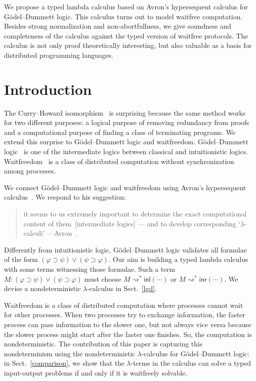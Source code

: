\documentclass[doctor]{iscs-thesis}
\newcommand{\reduce}{\rightsquigarrow}
\newcommand{\reduction}{\reduce^\ast}
\newcommand{\linl}[1]{\mathsf{inl}\left({#1}\right)}
\newcommand{\linr}[1]{\mathsf{inr}\left({#1}\right)}
\newcommand{\tj}   [2]{ {#1} \colon{#2} }
\begin{document}
We propose a typed lambda calculus based on Avron's hypersequent
calculus for G\"odel--Dummett logic.  This calculus turns out to model
waitfree computation.
Besides strong normalization and non-abortfullness, 
we give soundness and completeness of
the calculus against the typed version of waitfree protocols.
The calculus is not only proof theoretically interesting,
but also valuable as a basis for distributed programming languages.

\section{Introduction}

The Curry--Howard isomorphism~\cite{curryhoward} is surprising because the same
method works for two different purposes: a logical purpose of
removing redundancy from proofs and a computational purpose of finding a
class of terminating programs.
We extend
this surprise to G\"odel--Dummett logic and
waitfreedom.
G\"odel--Dummett logic~\cite{dummett59}
is one of the intermediate logics
between classical and intuitionistic logics.
Waitfreedom~\cite{Herlihy88,Saks:1993vq} is a class of distributed
computation without synchronization among processes.

We connect G\"odel--Dummett logic and waitfreedom using
Avron's hypersequent calculus~\cite{avron91}.
We respond to his suggestion:
\begin{quote}
it seems to us extremely important to determine the exact
       computational content of them~[intermediate logics] ---
       and {to develop corresponding `$\lambda$-calculi'}
       ---Avron~\cite{avron91}. 
\end{quote}
Differently from intuitionistic logic, G\"odel--Dummett logic validates
all formulae of the form
 $(\varphi\supset\psi)\vee(\psi\supset\varphi)$.
Our aim is building a typed lambda calculus
with some terms witnessing those formulae.
Such a term
$\tj{M}{(\varphi\supset\psi)\vee(\psi\supset\varphi)}$ must choose 
$M\reduction \linl\cdots$ or $M\reduction \linr\cdots$.
We devise a nondeterministic $\lambda$-calculus in Sect.~\ref{lgd}.

Waitfreedom is a class of distributed computation where
processes cannot wait for other processes.  When two processes try to
exchange information, the faster process can pass information to the
slower one, but not always vice versa because the slower process might
start after the faster one finishes.
So, the computation is nondeterministic.
The contribution of this paper is capturing
this nondeterminism using the nondeterministic $\lambda$-calculus for
G\"odel--Dummett logic: in Sect.~\ref{comparison}, we show that the
$\lambda$-terms in the calculus can solve a typed input-output
problems if and only if it is waitfreely solvable.
\end{document}
